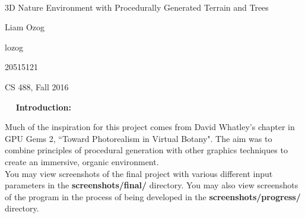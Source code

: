 \documentclass{article}
\newcommand\projecttitle{3D Nature Environment with Procedurally Generated Terrain and Trees}
\newcommand\myname{Liam Ozog}
\newcommand\myuserid{lozog}
\newcommand\mystudentid{20515121}
\newcommand\myclass{CS 488, Fall 2016}
\begin{document}
~\vfill
\begin{center}
\Large

\projecttitle

\myname

\myuserid

\mystudentid

\myclass

\end{center}
\vfill ~\vfill~
\newpage
\Large\noindent\textbf{Introduction:} \\
\normalsize

Much of the inspiration for this project comes from David Whatley's chapter in GPU Gems 2, ``Toward Photorealism in Virtual Botany". The aim was to combine principles of procedural generation with other graphics techniques to create an immersive, organic environment.
\\

You may view screenshots of the final project with various different input parameters in the \textbf{screenshots/final/} directory. You may also view screenshots of the program in the process of being developed in the \textbf{screenshots/progress/} directory.
\\
\end{document}
